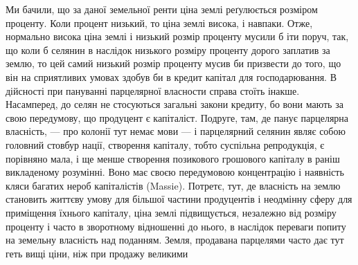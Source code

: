 Ми бачили, що за даної земельної ренти ціна землі реґулюється розміром проценту.
Коли процент низький, то ціна землі висока, і навпаки. Отже, нормально висока
ціна землі і низький розмір проценту мусили б іти поруч, так, що коли б селянин
в наслідок низького розміру проценту дорого заплатив за землю, то цей самий низький
розмір проценту мусив би призвести до того, що він на сприятливих умовах здобув би в кредит капітал
для господарювання. В дійсності при пануванні парцелярної
власности справа стоїть інакше. Насамперед, до селян не стосуються загальні закони
кредиту, бо вони мають за свою передумову, що продуцент є капіталіст.
Подруге, там, де панує парцелярна власність, — про колонії тут немає мови —
і парцелярний селянин являє собою головний стовбур нації, створення капіталу,
тобто суспільна репродукція, є порівняно мала, і ще менше створення позикового
грошового капіталу в раніш викладеному розумінні. Воно має своєю передумовою
концентрацію і наявність кляси багатих нероб капіталістів (Massie). Потретє, тут,
де власність на землю становить життєву умову для більшої частини продуцентів
і неодмінну сферу для приміщення їхнього капіталу, ціна землі підвищується,
незалежно від розміру проценту і часто в зворотному відношенні до
нього, в наслідок переваги попиту на земельну власність над поданням. Земля,
продавана парцелями часто дає тут геть вищі ціни, ніж при продажу великими
\parbreak{}  %

